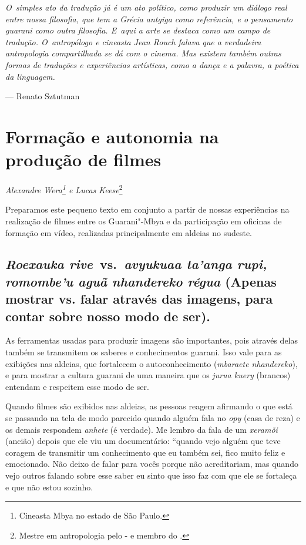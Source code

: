 \begin{flushleft}
\begin{minipage}[c]{0.85\textwidth}
\raggedright
\footnotesize
\emph{O~simples ato da tradução já é um ato político, como produzir um diálogo
real entre nossa filosofia, que tem a Grécia antgiga como referência, e
o pensamento guarani como outra filosofia. E~aqui a arte se destaca
como um campo de tradução. O~antropólogo e cineasta Jean Rouch falava
que a verdadeira antropologia compartilhada se dá com o cinema. Mas
existem também outras formas de traduções e experiências artísticas,
como a dança e a palavra, a poética da linguagem.}

\smallskip
\hspace*{\fill}--- Renato Sztutman
\end{minipage}
\end{flushleft}

\chapter{Formação e autonomia na produção de filmes}
\begin{flushright}
\emph{Alexandre Wera\footnote{Cineasta Mbya no estado de São Paulo.} e Lucas
Keese}\footnote{Mestre em antropologia pelo - e membro do
.}
\end{flushright}
\medskip

\noindent Preparamos este pequeno texto em conjunto a partir de nossas
experiências na realização de filmes entre os Guarani"-Mbya e da
participação em oficinas de formação em vídeo, realizadas
principalmente em aldeias no sudeste.

\section{\emph{Roexauka rive}~vs.~\emph{avyukuaa ta’anga rupi, romombe’u aguã nhandereko régua}
(Apenas mostrar vs. falar através das imagens, para contar sobre nosso
modo de ser).}%


As ferramentas usadas para produzir imagens são importantes, pois
através delas também se transmitem os saberes e conhecimentos guarani.
Isso vale para as exibições nas aldeias, que fortalecem o
autoconhecimento (\emph{mbaraete nhandereko}), e para mostrar a cultura
guarani de uma maneira que os \emph{jurua kuery} (brancos) entendam e
respeitem esse modo de ser.

Quando filmes são exibidos nas aldeias, as pessoas reagem afirmando o
que está se passando na tela de modo parecido quando alguém fala no \emph{opy}
(casa de reza) e os demais respondem \emph{anhete} (é verdade). Me lembro da
fala de um \emph{xeramõi} (ancião) depois que ele viu um documentário: ``quando
vejo alguém que teve coragem de transmitir um conhecimento que eu
também sei, fico muito feliz e emocionado. Não deixo de falar para
vocês porque não acreditariam, mas quando vejo outros falando sobre
esse saber eu sinto que isso faz com que ele se fortaleça e que não
estou sozinho.


